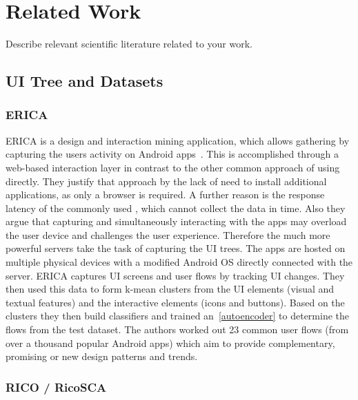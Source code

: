 \chapter{Related Work}

Describe relevant scientific literature related to your work.

\section{UI Tree and Datasets}

\subsection{ERICA}

ERICA is a design and interaction mining application, which allows gathering  by capturing the users activity on Android apps~\cite{deka2016erica}.
This is accomplished through a web-based interaction layer in contrast to the other common approach of using  directly.
They justify that approach by the lack of need to install additional applications, as only a browser is required.
A further reason is the response latency of the commonly used , which cannot collect the data in time.
Also they argue that capturing and simultaneously interacting with the apps may overload the user device and challenges the user experience.
Therefore the much more powerful servers take the task of capturing the UI trees.
The apps are hosted on multiple physical devices with a modified Android OS directly connected with the server.
ERICA captures UI screens and user flows by tracking UI changes.
They then used this data to form k-mean clusters from the UI elements (visual and textual features) and the interactive elements (icons and buttons).
Based on the clusters they then build classifiers and trained an~\ref{autoencoder} to determine the flows from the test dataset.
The authors worked out 23 common user flows (from over a thousand popular Android apps) which aim to provide complementary, promising or new design patterns and trends.



\subsection{RICO / RicoSCA}

